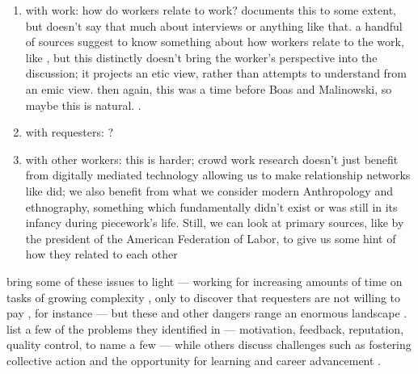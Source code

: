 \documentclass[trackingWork]{subfiles}
\begin{document}
{\subsubsubsection{\pieceworkpers}
\begin{enumerate}
  \item with work: how do workers relate to work?
        \citeauthor{riisOtherSideLives} documents this to some extent,
        but doesn't say that much about interviews or anything like that.
        a handful of sources suggest to know something about
        how workers relate to the work, like \citeauthor{clark1908cotton},
        but this distinctly doesn't bring the worker's perspective into the discussion;
        it projects an etic view, rather than attempts to understand from an emic view.
        then again, this was a time before Boas and Malinowski, so maybe this is natural.
        \cite{riisOtherSideLives,clark1908cotton}.
  \item with requesters:
        \cite{levi2009union,ahlquist2013interest,
              mccallum2013global,jacoby1983union}?
  \item with other workers: this is harder; crowd work research doesn't just benefit from
        digitally mediated technology allowing us to make
        relationship networks like \citeauthor{crowdcollab} did;
        we also benefit from what we consider modern Anthropology and ethnography,
        something which fundamentally didn't exist or was still in its infancy during piecework's life.
        Still, we can look at primary sources, like \cite{american1921problem} by
        the president of the American Federation of Labor,
        to give us some hint of how they related to each other
        \cite{american1921problem,crowdcollab}
\end{enumerate}



\subsubsubsection{\whatchanged}



\subsubsubsection{\implication}




}




\citeauthor{professionalcrowdworkEthics} bring some of these issues to light
--- working for increasing amounts of time on tasks of growing complexity%
, only to discover that requesters are not willing to pay%
, for instance ---
but these and other dangers range an enormous landscape
\cite{professionalcrowdworkEthics}.
\citeauthor{crowdworkFuture}
list a few of the problems they identified in \citeyear{crowdworkFuture}
--- motivation, feedback, reputation, quality control, to name a few ---
while others discuss challenges such as fostering collective action
and the opportunity for learning and career advancement
\cite{crowdworkFuture,nickerson2013crowd,dynamo}.
\end{document}

